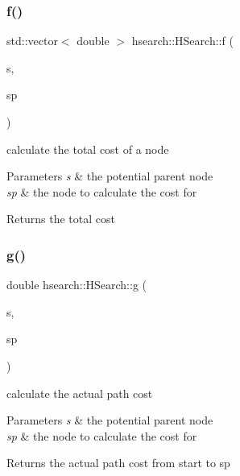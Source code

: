 \subsubsection{\texorpdfstring{f()}{f()}}
{\footnotesize\ttfamily std\+::vector$<$ double $>$ hsearch\+::\+H\+Search\+::f (\begin{DoxyParamCaption}\item[{\hyperlink{structhsearch_1_1SearchNode}{Search\+Node}}]{s,  }\item[{\hyperlink{structhsearch_1_1SearchNode}{Search\+Node}}]{sp }\end{DoxyParamCaption})\hspace{0.3cm}{\ttfamily [protected]}}



calculate the total cost of a node 


\begin{DoxyParams}{Parameters}
{\em s} & the potential parent node \\
\hline
{\em sp} & the node to calculate the cost for \\
\hline
\end{DoxyParams}
\begin{DoxyReturn}{Returns}
the total cost 
\end{DoxyReturn}
\mbox{\label{classhsearch_1_1HSearch_a687960c8dcfc61e16613a72a4ff1c14d}} 
\subsubsection{\texorpdfstring{g()}{g()}}
{\footnotesize\ttfamily double hsearch\+::\+H\+Search\+::g (\begin{DoxyParamCaption}\item[{\hyperlink{structhsearch_1_1SearchNode}{Search\+Node}}]{s,  }\item[{\hyperlink{structhsearch_1_1SearchNode}{Search\+Node}}]{sp }\end{DoxyParamCaption})\hspace{0.3cm}{\ttfamily [protected]}}



calculate the actual path cost 


\begin{DoxyParams}{Parameters}
{\em s} & the potential parent node \\
\hline
{\em sp} & the node to calculate the cost for \\
\hline
\end{DoxyParams}
\begin{DoxyReturn}{Returns}
the actual path cost from start to sp 
\end{DoxyReturn}
\mbox{\label{classhsearch_1_1HSearch_a93b63eb8983863eb40f7bb1f28af5c36}} 
